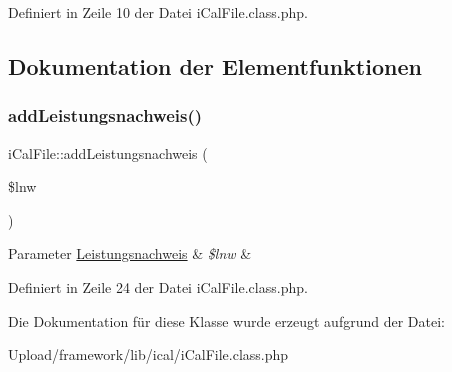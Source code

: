 Definiert in Zeile 10 der Datei i\+Cal\+File.\+class.\+php.



\subsection{Dokumentation der Elementfunktionen}
\mbox{\label{classi_cal_file_ae4381422fa804435572b690ff7ddc29e}} 
\subsubsection{\texorpdfstring{add\+Leistungsnachweis()}{addLeistungsnachweis()}}
{\footnotesize\ttfamily i\+Cal\+File\+::add\+Leistungsnachweis (\begin{DoxyParamCaption}\item[{}]{\$lnw }\end{DoxyParamCaption})}


\begin{DoxyParams}[1]{Parameter}
\mbox{\hyperlink{class_leistungsnachweis}{Leistungsnachweis}} & {\em \$lnw} & \\
\hline
\end{DoxyParams}


Definiert in Zeile 24 der Datei i\+Cal\+File.\+class.\+php.



Die Dokumentation für diese Klasse wurde erzeugt aufgrund der Datei\+:\begin{DoxyCompactItemize}
\item 
Upload/framework/lib/ical/i\+Cal\+File.\+class.\+php\end{DoxyCompactItemize}
